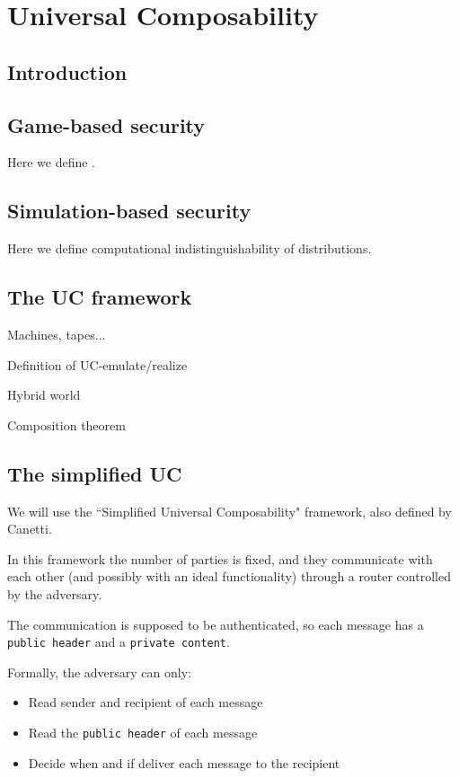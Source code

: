 \chapter{Universal Composability}

\section{Introduction}

\section{Game-based security}
Here we define \indcpa.

\section{Simulation-based security}
Here we define computational indistinguishability of distributions.

\section{The UC framework}
Machines, tapes...

Definition of UC-emulate/realize

Hybrid world

Composition theorem

\section{The simplified UC}
We will use the ``Simplified Universal Composability" framework, also defined by Canetti.

In this framework the number of parties is fixed, and they communicate with each other (and possibly with an ideal functionality) through a router controlled by the adversary.

The communication is supposed to be authenticated, so each message has a \texttt{public header} and a \texttt{private content}.

Formally, the adversary can only:
\begin{itemize}
    \item Read sender and recipient of each message
    \item Read the \texttt{public header} of each message
    \item Decide when and if deliver each message to the recipient
\end{itemize}

